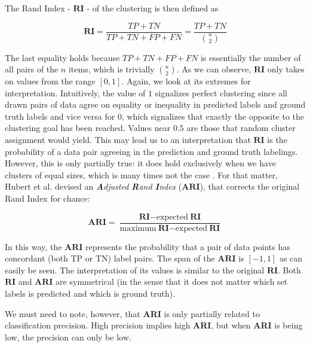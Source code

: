 The Rand Index - $\textbf{RI}$ - of the clustering is then defined as

\begin{equation}
\textbf{RI} = \frac{TP+TN}{TP+TN+FP+FN} = \frac{TP+TN}{\binom{n}{2}}
\end{equation}

The last equality holds because $TP+TN+FP+FN$ is essentially the number of all pairs of the $n$ items, which is trivially $\binom{n}{2}$. As we can observe, $\textbf{RI}$ only takes on values from the range $[0, 1]$. Again, we look at its extremes for interpretation. Intuitively, the value of $1$ signalizes perfect clustering since all drawn pairs of data agree on equality or inequality in predicted labels and ground truth labels and vice versa for $0$, which signalizes that exactly the opposite to the clustering goal has been reached. Values near $0.5$ are those that random cluster assignment would yield. This may lead us to an interpretation that $\textbf{RI}$ is the probability of a data pair agreeing in the prediction and ground truth labelings. However, this is only partially true: it does hold exclusively when we have clusters of equal sizes, which is many times not the case \cite{hubert1985comparing}. For that matter, Hubert et al. \cite{hubert1985comparing} devised an \textit{\textbf{A}djusted \textbf{R}and \textbf{I}ndex} ($\textbf{ARI}$), that corrects the original Rand Index for chance:

\begin{equation}
\textbf{ARI} = \frac{
\textbf{RI} - \text{expected}~ \textbf{RI}
}{
 \text{maximum}~  \textbf{RI} - \text{expected}~ \textbf{RI}
}
\end{equation}

In this way, the $\textbf{ARI}$ represents the probability that a pair of data points has concordant (both TP or TN) label pairs. The span of the $\textbf{ARI}$ is $[-1, 1]$ as can easily be seen. The interpretation of its values is similar to the original $\textbf{RI}$. Both $\textbf{RI}$ and $\textbf{ARI}$ are symmetrical (in the sense that it does not matter which set labels is predicted and which is ground truth).

We must need to note, however, that \textbf{ARI} is only partially related to classification precision. High precision implies high \textbf{ARI}, but when \textbf{ARI} is being low, the precision can only be low.

